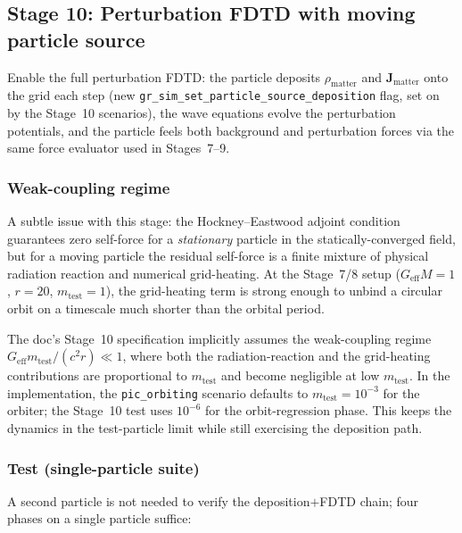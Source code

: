 \documentclass[11pt,a4paper]{article}
\newcommand{\vv}[1]{\mathbf{#1}}
\begin{document}
\subsection{Stage 10: Perturbation FDTD with moving particle source}
\label{sec:stage_perturb_fdtd}

Enable the full perturbation FDTD: the particle deposits $\rho_{\mathrm{matter}}$ and $\vv{J}_{\mathrm{matter}}$ onto the grid each step (new \texttt{gr\_sim\_set\_particle\_source\_deposition} flag, set on by the Stage~10 scenarios), the wave equations evolve the perturbation potentials, and the particle feels both background and perturbation forces via the same force evaluator used in Stages~7--9.

\subsubsection*{Weak-coupling regime}

A subtle issue with this stage: the Hockney--Eastwood adjoint condition
guarantees zero self-force for a \emph{stationary} particle in the
statically-converged field, but for a moving particle the residual
self-force is a finite mixture of physical radiation reaction and
numerical grid-heating.  At the Stage~7/8 setup ($G_{\mathrm{eff}} M = 1$,
$r = 20$, $m_{\mathrm{test}} = 1$), the grid-heating term is strong enough
to unbind a circular orbit on a timescale much shorter than the orbital
period.

The doc's Stage~10 specification implicitly assumes the weak-coupling
regime $G_{\mathrm{eff}} m_{\mathrm{test}} / (c^2 r) \ll 1$, where both
the radiation-reaction and the grid-heating contributions are
proportional to $m_{\mathrm{test}}$ and become negligible at low
$m_{\mathrm{test}}$.  In the implementation, the
\texttt{pic\_orbiting} scenario defaults to
$m_{\mathrm{test}} = 10^{-3}$ for the orbiter; the Stage~10 test uses
$10^{-6}$ for the orbit-regression phase.  This keeps the dynamics in
the test-particle limit while still exercising the deposition path.

\subsubsection*{Test (single-particle suite)}

A second particle is not needed to verify the deposition$+$FDTD chain;
four phases on a single particle suffice:
\end{document}
